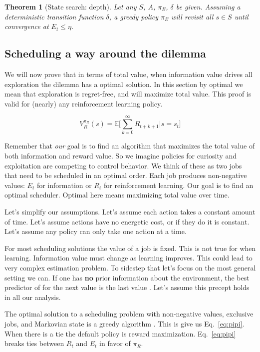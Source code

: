 \documentclass[9pt,lineno]{elife}
\newtheorem{theorem}{Theorem}
\begin{document}
\begin{theorem}[State search: depth] \label{theorem:convergence} 
	 Let any $S$, $A$, $\pi_E$, $\delta$ be given. Assuming a deterministic transition function $\delta$, a greedy policy $\pi_E$ will revisit all $s \in S$ until convergence at $E_t \leq \eta$. 
\end{theorem}


\subsection*{Scheduling a way around the dilemma} 
We will now prove that in terms of total value, when information value drives all exploration the dilemma has a optimal solution. In this section by optimal we mean that exploration is regret-free, and will maximize total value. This proof is valid for (nearly) any reinforcement learning policy.

\begin{equation}\label{eq:V_R} 
	V^{\pi_R}_R(s) = \mathbb{E} \Big [ \sum_{k=0}^{\infty} R_{t+k+1} \big | s = s_t \Big ]
\end{equation}

Remember that \textit{our} goal is to find an algorithm that maximizes the total value of both information and reward value. So we imagine policies for curiosity and exploitation are competing to control behavior. We think of these as two jobs that need to be scheduled in an optimal order. Each job produces non-negative values: $E_t$ for information or $R_t$ for reinforcement learning. Our goal is to find an optimal scheduler. Optimal here means maximizing total value over time.

Let's simplify our assumptions. Let's assume each action takes a constant amount of time. Let's assume actions have no energetic cost, or if they do it is constant. Let's assume any policy can only take one action at a time. 

For most scheduling solutions the value of a job is fixed. This is not true for when learning. Information value must change as learning improves. This could lead to very complex estimation problem. To sidestep that let's focus on the most general setting we can. If one has \textbf{no} prior information about the environment, the best predictor of for the next value is the last value \cite{Hocker2019,Roughgarden2019}. Let's assume this precept holds in all our analysis. 

The optimal solution to a scheduling problem with non-negative values, exclusive jobs, and Markovian state is a greedy algorithm \cite{Bellmann1954,Roughgarden2019}. This is give us Eq.~\ref{eq:pipi}. When there is a tie the default policy is reward maximization. Eq.~\ref{eq:pipi} breaks ties between $R_t$ and $E_t$ in favor of $\pi_R$.
\end{document}
